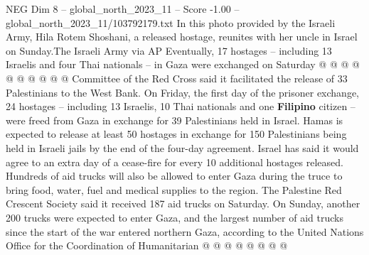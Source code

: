 \begin{textsample}{NEG Dim 8 – global\_north\_2023\_11 – Score -1.00 – global\_north\_2023\_11/103792179.txt}
In this photo provided by the Israeli Army, Hila Rotem Shoshani, a released hostage, reunites with her uncle in Israel on Sunday.The Israeli Army via AP Eventually, 17 hostages -- including 13 Israelis and four Thai nationals -- in Gaza were exchanged on Saturday @ @ @ @ @ @ @ @ @ @ Committee of the Red Cross said it facilitated the release of 33 Palestinians to the West Bank.
On Friday, the first day of the prisoner exchange, 24 hostages -- including 13 Israelis, 10 Thai nationals and one \textbf{Filipino} citizen -- were freed from Gaza in exchange for 39 Palestinians held in Israel.
Hamas is expected to release at least 50 hostages in exchange for 150 Palestinians being held in Israeli jails by the end of the four-day agreement.
Israel has said it would agree to an extra day of a cease-fire for every 10 additional hostages released.
Hundreds of aid trucks will also be allowed to enter Gaza during the truce to bring food, water, fuel and medical supplies to the region.
The Palestine Red Crescent Society said it received 187 aid trucks on Saturday.
On Sunday, another 200 trucks were expected to enter Gaza, and the largest number of aid trucks since the start of the war entered northern Gaza, according to the United Nations Office for the Coordination of Humanitarian @ @ @ @ @ @ @ @

\end{textsample}
